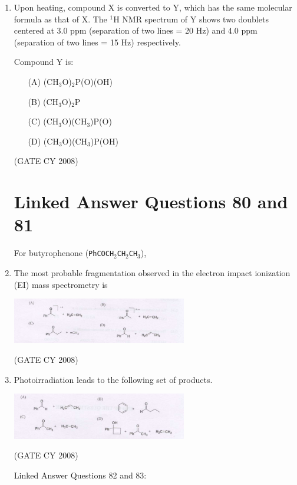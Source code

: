 \documentclass[12pt]{article}
\begin{document}
\begin{enumerate}
    \item Upon heating, compound X is converted to Y, which has the same molecular formula as that of X. The $^1$H NMR spectrum of Y shows two doublets centered at 3.0 ppm (separation of two lines = 20 Hz) and 4.0 ppm (separation of two lines = 15 Hz) respectively.

    Compound Y is:
    \begin{enumerate}
        \item[(A)] (CH$_3$O)$_2$P(O)(OH)
        \item[(B)] (CH$_3$O)$_2$P
        \item[(C)] (CH$_3$O)(CH$_3$)P(O)
        \item[(D)] (CH$_3$O)(CH$_3$)P(OH)
    \end{enumerate}
   \hfill{(GATE CY 2008)}


\section*{Linked Answer Questions 80 and 81}

For butyrophenone (\texttt{PhCOCH\(_2\)CH\(_2\)CH\(_3\)}),

\item \quad The most probable fragmentation observed in the electron impact ionization (EI) mass spectrometry is

\begin{center}
\includegraphics[width=0.6\textwidth]{figs/q80.png}
\end{center}    \hfill{(GATE CY 2008)}


\item \quad Photoirradiation leads to the following set of products.

\begin{center}
\includegraphics[width=0.6\textwidth]{figs/q81.png}
\end{center}    \hfill{(GATE CY 2008)}


{Linked Answer Questions 82 and 83:}


\end{enumerate}
\end{document}
